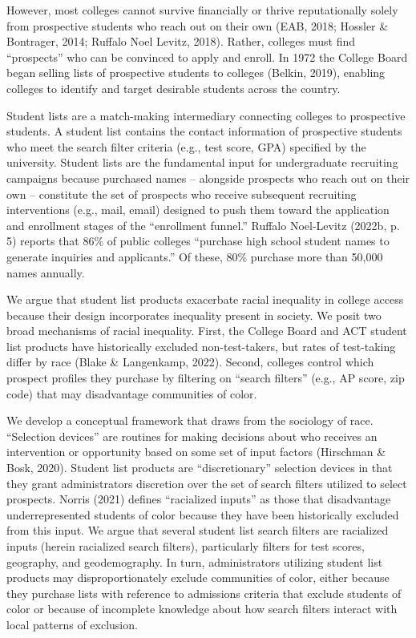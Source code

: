 \documentclass[
  12pt,
]{article}
\begin{document}
However, most colleges cannot survive financially or thrive reputationally solely from prospective students who reach out on their own (EAB, 2018; Hossler \& Bontrager, 2014; Ruffalo Noel Levitz, 2018). Rather, colleges must find ``prospects'' who can be convinced to apply and enroll. In 1972 the College Board began selling lists of prospective students to colleges (Belkin, 2019), enabling colleges to identify and target desirable students across the country.

Student lists are a match-making intermediary connecting colleges to prospective students. A student list contains the contact information of prospective students who meet the search filter criteria (e.g., test score, GPA) specified by the university. Student lists are the fundamental input for undergraduate recruiting campaigns because purchased names -- alongside prospects who reach out on their own -- constitute the set of prospects who receive subsequent recruiting interventions (e.g., mail, email) designed to push them toward the application and enrollment stages of the ``enrollment funnel.'' Ruffalo Noel-Levitz (2022b, p. 5) reports that 86\% of public colleges ``purchase high school student names to generate inquiries and applicants.'' Of these, 80\% purchase more than 50,000 names annually.

We argue that student list products exacerbate racial inequality in college access because their design incorporates inequality present in society. We posit two broad mechanisms of racial inequality. First, the College Board and ACT student list products have historically excluded non-test-takers, but rates of test-taking differ by race (Blake \& Langenkamp, 2022). Second, colleges control which prospect profiles they purchase by filtering on ``search filters'' (e.g., AP score, zip code) that may disadvantage communities of color.

We develop a conceptual framework that draws from the sociology of race. ``Selection devices'' are routines for making decisions about who receives an intervention or opportunity based on some set of input factors (Hirschman \& Bosk, 2020). Student list products are ``discretionary'' selection devices in that they grant administrators discretion over the set of search filters utilized to select prospects. Norris (2021) defines ``racialized inputs'' as those that disadvantage underrepresented students of color because they have been historically excluded from this input. We argue that several student list search filters are racialized inputs (herein racialized search filters), particularly filters for test scores, geography, and geodemography. In turn, administrators utilizing student list products may disproportionately exclude communities of color, either because they purchase lists with reference to admissions criteria that exclude students of color or because of incomplete knowledge about how search filters interact with local patterns of exclusion.
\end{document}

